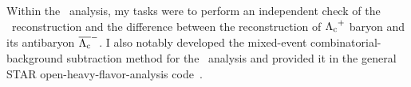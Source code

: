 Within the \Lambdac\ analysis, my tasks were to perform an independent check of the \Lambdac\ reconstruction and the difference between the reconstruction of ${\Lambda_\text{c}}^+$ baryon and its antibaryon $\overline{{\Lambda_\text{c}}}^-$\@. I also notably developed the mixed-event combinatorial-background subtraction method for the \Lambdac\ analysis and provided it in the general STAR open-heavy-flavor-analysis code~\cite{mixedEventCode}\@.



% 

